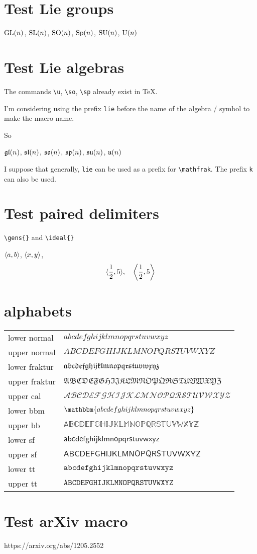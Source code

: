 \documentclass{scrartcl}
\begin{document}
\section{Test Lie groups}

$\GL(n)$, $\SL(n)$, $\SO(n)$, $\Sp(n)$, $\SU(n)$, $\U(n)$

\section{Test Lie algebras}

The commands \verb|\u|, \verb|\so|, \verb|\sp| already exist in \TeX.

I'm considering using the prefix \texttt{lie} before the name of the algebra / symbol to make the macro name.

So
\begin{LTXexample}[pos=b]
$\liegl(n)$, $\liesl(n)$, $\lieso(n)$, $\liesp(n)$, $\liesu(n)$, $\lieu(n)$
\end{LTXexample}


I suppose that generally, \texttt{lie} can be used as a prefix for \verb|\mathfrak|.
The prefix \texttt{k} can also be used.

\section{Test paired delimiters}
\verb|\gens{}| and \verb|\ideal{}|

$\gens{a,b}$,
$\ideal{x,y}$,
\[
\gens{\frac12, 5}, \quad
\gens*{\frac12, 5}
\]

\section{alphabets}

\begin{tabular}{ll}
lower normal & $abcdefghijklmnopqrstuvwxyz$ \\
upper normal & $ABCDEFGHIJKLMNOPQRSTUVWXYZ$ \\
lower fraktur & $\mathfrak{abcdefghijklmnopqrstuvwxyz}$ \\
upper fraktur & $\mathfrak{ABCDEFGHIJKLMNOPQRSTUVWXYZ}$ \\
upper cal & $\mathcal{ABCDEFGHIJKLMNOPQRSTUVWXYZ}$ \\
lower bbm & $\mathbbm{abcdefghijklmnopqrstuvwxyz}$ \\
upper bb & $\mathbb{ABCDEFGHIJKLMNOPQRSTUVWXYZ}$ \\
lower sf & $\mathsf{abcdefghijklmnopqrstuvwxyz}$ \\
upper sf & $\mathsf{ABCDEFGHIJKLMNOPQRSTUVWXYZ}$ \\
lower tt & $\mathtt{abcdefghijklmnopqrstuvwxyz}$ \\
upper tt & $\mathtt{ABCDEFGHIJKLMNOPQRSTUVWXYZ}$ \\
\end{tabular}


\section{Test arXiv macro}
https://arxiv.org/abs/1205.2552
\end{document}
